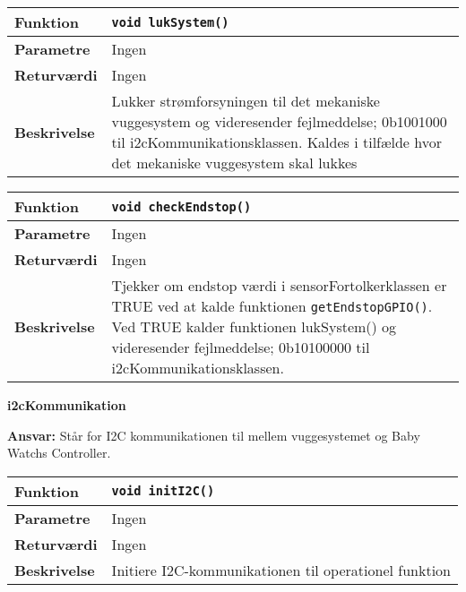 \begin{center}
    \begin{tabular}{ | l | p{} |}
    \hline
    \textbf{Funktion}	& \verb+void lukSystem() +						\\ \hline
    \textbf{Parametre} 	& Ingen		\\ \hline
    \textbf{Returværdi}	& Ingen 								\\ \hline
    \textbf{Beskrivelse}	& Lukker strømforsyningen til det mekaniske vuggesystem og videresender fejlmeddelse; 0b1001000 til i2cKommunikationsklassen. Kaldes i tilfælde hvor det mekaniske vuggesystem skal lukkes		\\ \hline
    \end{tabular}
\end{center}

\begin{center}
    \begin{tabular}{ | l | p{} |}
    \hline
    \textbf{Funktion}	& \verb+void checkEndstop() +						\\ \hline
    \textbf{Parametre} 	& Ingen		\\ \hline
    \textbf{Returværdi}	& Ingen 								\\ \hline
    \textbf{Beskrivelse}	& Tjekker om endstop værdi i sensorFortolkerklassen er TRUE ved at kalde funktionen \verb+getEndstopGPIO()+. Ved TRUE kalder funktionen lukSystem() og videresender fejlmeddelse; 0b10100000 til i2cKommunikationsklassen.		\\ \hline
    \end{tabular}
\end{center}


{\centering
\textbf{i2cKommunikation}\par
}
\textbf{Ansvar:} Står for I2C kommunikationen til mellem vuggesystemet og Baby Watchs Controller. \

\begin{center}
    \begin{tabular}{ | l | p{} |}
    \hline
    \textbf{Funktion}	& \verb+void initI2C() +									\\ \hline
    \textbf{Parametre} 	& Ingen														\\ \hline
    \textbf{Returværdi}	& Ingen 													\\ \hline
    \textbf{Beskrivelse}	& Initiere I2C-kommunikationen til operationel funktion	\\ \hline
    \end{tabular}
\end{center}

